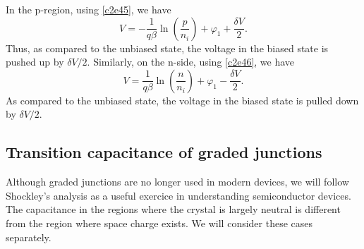 In the p-region, using \eqref{c2e45}, we have
\begin{equation}\label{c2e50}
V = -\frac{1}{q\beta}\ln\left(\frac{p}{n_i}\right) + \varphi_1 + 
\frac{\delta V}{2}.
\end{equation}
Thus, as compared to the unbiased state, the voltage in the biased state is
pushed up by $\delta V/2$. Similarly, on the n-side, using \eqref{c2e46}, we 
have
\begin{equation}\label{c2e51}
V = \frac{1}{q\beta}\ln\left(\frac{n}{n_i}\right) + \varphi_1 - 
\frac{\delta V}{2}.
\end{equation}
As compared to the unbiased state, the voltage in the biased state is pulled
down by $\delta V/2$. 

\subsection{Transition capacitance of graded junctions}
Although graded junctions are no longer used in modern devices, we will follow
Shockley's analysis as a useful exercice in understanding semiconductor devices.
The capacitance in the regions where the crystal is largely neutral is different
from the region where space charge exists. We will consider these cases
separately.

